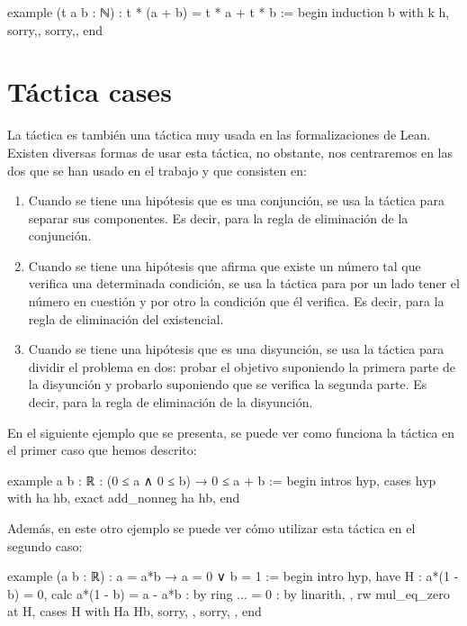 \begin{leancode}
example (t a b : ℕ) : t * (a + b) = t * a + t * b :=
begin
  induction b with k h,
  {sorry,},
  {sorry,},
end
\end{leancode}

\section{Táctica cases}

La táctica  es también una táctica muy usada en las
formalizaciones de Lean. Existen diversas formas de usar esta táctica, no
obstante, nos centraremos en las dos que se han usado en el trabajo y que
consisten en:
\begin{enumerate}
\item Cuando se tiene una hipótesis que es una conjunción, se usa la
  táctica  para separar sus componentes. Es decir,
  para la regla de eliminación de la conjunción.

\item Cuando se tiene una hipótesis que afirma que existe un número tal que
  verifica una determinada condición, se usa la táctica 
  para por un lado tener el número en cuestión y por otro la condición que él
  verifica. Es decir, para la regla de eliminación del existencial.

\item Cuando se tiene una hipótesis que es una disyunción, se usa la táctica
   para dividir el problema en dos: probar el objetivo
  suponiendo la primera parte de la disyunción y probarlo suponiendo que
  se verifica la segunda parte. Es decir, para la regla de eliminación
  de la disyunción.
\end{enumerate}

En el siguiente ejemplo que se presenta, se puede ver como funciona la táctica
en el primer caso que hemos descrito:

\begin{leancode}
example {a b : ℝ} : (0 ≤ a ∧ 0 ≤ b) → 0 ≤ a + b :=
begin
  intros hyp,
  cases hyp with ha hb,
  exact add_nonneg ha hb,
end
\end{leancode}

Además, en este otro ejemplo se puede ver cómo utilizar esta táctica en el
segundo caso:

\begin{leancode}
example (a b : ℝ) : a = a*b → a = 0 ∨ b = 1 :=
begin
  intro hyp,
  have H : a*(1 - b) = 0,
  { calc a*(1 - b) = a - a*b : by ring
               ... = 0       : by linarith, },
  rw mul_eq_zero at H,
  cases H with Ha Hb,
  { sorry, },
  { sorry, },
end
\end{leancode}

